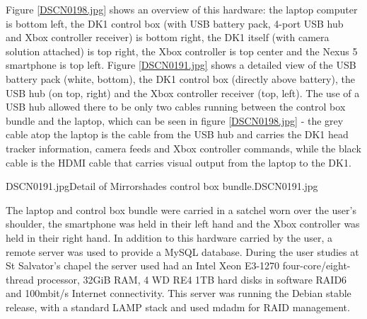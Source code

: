 Figure \ref{DSCN0198.jpg} shows an overview of this hardware: the laptop computer is bottom left, the DK1 control box (with USB battery pack, 4-port USB hub and Xbox controller receiver) is bottom right, the DK1 itself (with camera solution attached) is top right, the Xbox controller is top center and the Nexus 5 smartphone is top left. Figure \ref{DSCN0191.jpg} shows a detailed view of the USB battery pack (white, bottom), the DK1 control box (directly above battery), the USB hub (on top, right) and the Xbox controller receiver (top, left). The use of a USB hub allowed there to be only two cables running between the control box bundle and the laptop, which can be seen in figure \ref{DSCN0198.jpg} - the grey cable atop the laptop is the cable from the USB hub and carries the DK1 head tracker information, camera feeds and Xbox controller commands, while the black cable is the HDMI cable that carries visual output from the laptop to the DK1.

       {DSCN0191.jpg}{Detail of Mirrorshades control box bundle.}{DSCN0191.jpg}

The laptop and control box bundle were carried in a satchel worn over the user's shoulder, the smartphone was held in their left hand and the Xbox controller was held in their right hand. In addition to this hardware carried by the user, a remote server was used to provide a MySQL database. During the user studies at St Salvator's chapel the server used had an Intel Xeon E3-1270 four-core/eight-thread processor, 32GiB RAM, 4 WD RE4 1TB hard disks in software RAID6 and 100mbit/s Internet connectivity. This server was running the Debian stable release, with a standard LAMP stack and used mdadm for RAID management.

